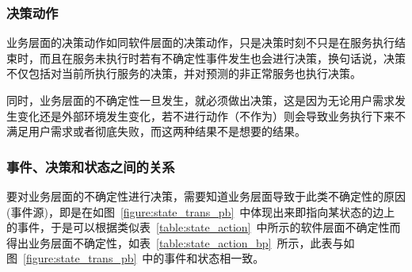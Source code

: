 \subsubsection{决策动作}

业务层面的决策动作如同软件层面的决策动作，只是决策时刻不只是在服务执行结束时，而且在服务未执行时若有不确定性事件发生也会进行决策，换句话说，决策不仅包括对当前所执行服务的决策，并对预测的非正常服务也执行决策。

同时，业务层面的不确定性一旦发生，就必须做出决策，这是因为无论用户需求发生变化还是外部环境发生变化，若不进行动作（不作为）则会导致业务执行下来不满足用户需求或者彻底失败，而这两种结果不是想要的结果。

\subsubsection{事件、决策和状态之间的关系}

要对业务层面的不确定性进行决策，需要知道业务层面导致于此类不确定性的原因(事件源)，即是在如图~\ref{figure:state_trans_pb}~中体现出来即指向某状态的边上的事件，于是可以根据类似表~\ref{table:state_action}~中所示的软件层面不确定性而得出业务层面不确定性，如表~\ref{table:state_action_bp}~所示，此表与如图~\ref{figure:state_trans_pb}~中的事件和状态相一致。

